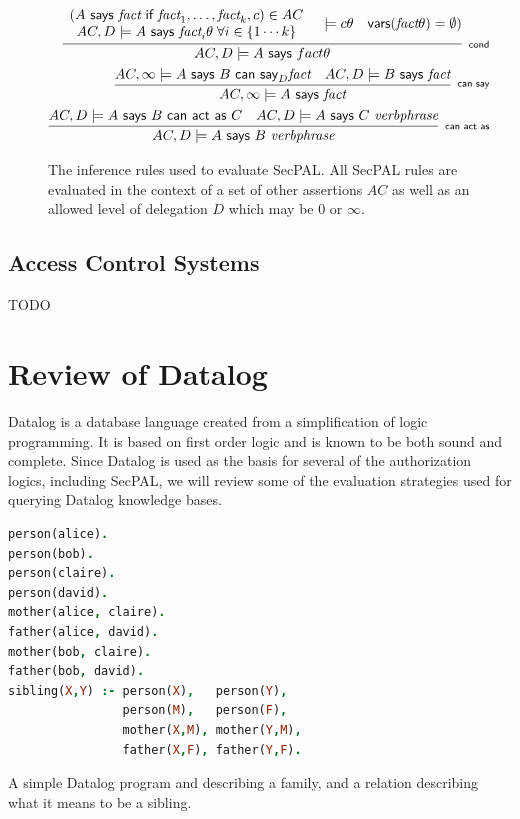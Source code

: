 \documentclass[a4paper,12pt,sfsidenotes]{tufte-book}
\begin{document}
\begin{figure}\label{secpal:rules}
  \centering
  \begin{eqnarray*}
    \infer[\textsf{\scriptsize cond}]{%
      AC, D \models A\textsf{~says~}fact\theta
    }{%
      \begin{array}[c]{c}
        \left(A\textsf{~says~}\textit{fact}\textsf{~if~}\textit{fact}_1, \ldots, \textit{fact}_k, c\right) \in AC \\
        AC,D\models A\textsf{~says~}\textit{fact}_i\theta \; \forall i \in \{1\cdots k\}
      \end{array}
      & \models{c\theta}
      & \textsf{vars}(\textit{fact}\theta) = \emptyset)
    }\\
    \infer[\textsf{\scriptsize can say}]{%
      AC, \infty \models A\textsf{~says~}\textit{fact}
    }{%
      AC, \infty \models A\textsf{~says~}B\textsf{~can~say}_D \textit{fact}
      & AC, D \models B\textsf{~says~}\textit{fact}
    } \\
    \infer[\textsf{\scriptsize can act as}]{%
      AC, D \models A\textsf{~says~}B~\textit{verbphrase}
    }{%
      AC, D \models A\textsf{~says~}B\textsf{~can~act~as~}C
      & AC, D \models A\textsf{~says~}C~\textit{verbphrase}
    }
  \end{eqnarray*}
  \caption{The inference rules used to evaluate {SecPAL}. All {SecPAL} rules are
  evaluated in the context of a set of other assertions $AC$ as well as an
  allowed level of delegation $D$ which may be $0$ or $\infty$.}
\end{figure}

\subsection{Access Control Systems}


{\Huge TODO}

\section{Review of Datalog}

Datalog is a database language created from a simplification of logic
programming.  It is based on first order logic and is known to be both sound and
complete.  Since Datalog is used as the basis for several of the authorization
logics, including SecPAL, we will review some of the evaluation strategies used
for querying Datalog knowledge bases.

\begin{marginfigure}
  \label{datalog:example}
  \begin{lstlisting}[language=Prolog]
person(alice).  
person(bob).
person(claire). 
person(david).
mother(alice, claire).
father(alice, david).
mother(bob, claire).
father(bob, david).
sibling(X,Y) :- person(X),   person(Y),
                person(M),   person(F),
                mother(X,M), mother(Y,M), 
                father(X,F), father(Y,F).
  \end{lstlisting}
  \caption{A simple Datalog program and describing a family, and a relation
  describing what it means to be a sibling.}
\end{marginfigure}
\end{document}
